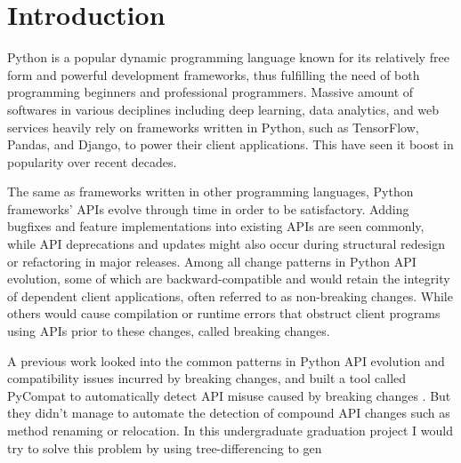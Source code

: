 \chapter{Introduction}
\label{chap:introduction}

Python is a popular dynamic programming language known for its relatively free form and powerful development frameworks, thus fulfilling the need of both programming beginners and professional programmers. Massive amount of softwares in various deciplines including deep learning, data analytics, and web services heavily rely on frameworks written in Python, such as TensorFlow, Pandas, and Django, to power their client applications. This have seen it boost in popularity over recent decades.

The same as frameworks written in other programming languages, Python frameworks' APIs evolve through time in order to be satisfactory. Adding bugfixes and feature implementations into existing APIs are seen commonly, while API deprecations and updates might also occur during structural redesign or refactoring in major releases. Among all change patterns in Python API evolution, some of which are backward-compatible and would retain the integrity of dependent client applications, often referred to as non-breaking changes. While others would cause compilation or runtime errors that obstruct client programs using APIs prior to these changes, called breaking changes.

A previous work looked into the common patterns in Python API evolution and compatibility issues incurred by breaking changes, and built a tool called PyCompat to automatically detect API misuse caused by breaking changes \cite{9054800}. But they didn't manage to automate the detection of compound API changes such as method renaming or relocation. In this undergraduate graduation project I would try to solve this problem by using tree-differencing to gen
